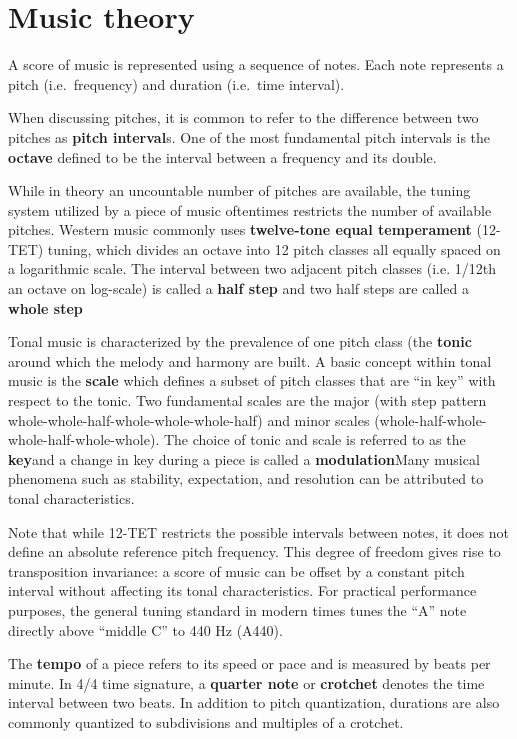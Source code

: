 \documentclass[a4paper,12pt,twoside,openright]{report}
\begin{document}
\section{Music theory}

A score of music is represented using a sequence of notes. Each note represents
a pitch (i.e.\ frequency) and duration (i.e.\ time interval).

When discussing pitches, it is common to refer to the difference between two
pitches as \textbf{pitch interval}s. One of the most fundamental pitch intervals is the
\textbf{octave} defined to be the interval between a frequency and its double.

While in theory an uncountable number of pitches are available, the tuning
system utilized by a piece of music oftentimes restricts the number of
available pitches. Western music commonly uses \textbf{twelve-tone equal
temperament} (12-TET) tuning, which divides an octave into 12 pitch classes
all equally spaced on a logarithmic scale. The interval between two adjacent
pitch classes (i.e. 1/12th an octave on log-scale) is called a \textbf{half step}
and two half steps are called a \textbf{whole step}

Tonal music is characterized by the prevalence of one pitch class (the
\textbf{tonic} around which the melody and harmony are built. A basic concept
within tonal music is the \textbf{scale} which defines a subset of pitch classes
that are ``in key'' with respect to the tonic. Two fundamental scales are the
major (with step pattern whole-whole-half-whole-whole-whole-half) and minor
scales (whole-half-whole-whole-half-whole-whole). The choice of tonic and scale
is referred to as the \textbf{key}and a change in key during a piece is called a
\textbf{modulation}Many musical phenomena such as stability, expectation, and
resolution can be attributed to tonal characteristics.

Note that while 12-TET restricts the possible intervals between notes, it does
not define an absolute reference pitch frequency. This degree of freedom gives
rise to transposition invariance: a score of music can be offset by a constant
pitch interval without affecting its tonal characteristics. For practical
performance purposes, the general tuning standard in modern times tunes the ``A''
note directly above ``middle C'' to 440 Hz (A440).

The \textbf{tempo} of a piece refers to its speed or pace and is measured by beats
per minute. In 4/4 time signature, a \textbf{quarter note} or \textbf{crotchet} denotes
the time interval between two beats. In addition to pitch quantization,
durations are also commonly quantized to subdivisions and multiples of a
crotchet.
\end{document}
